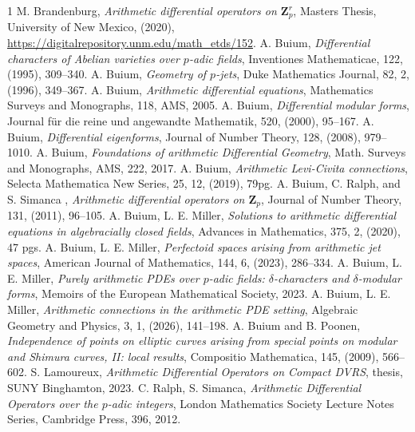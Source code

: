 \documentclass[10pt]{amsart}
\theoremstyle{Theorem}
\theoremstyle{definition}
\newcommand{\ZZ}{\mathbf Z}
\begin{document}
\begin{thebibliography}{1}
 M. Brandenburg, {\em Arithmetic differential operators on $\ZZ_p^r$}, Masters Thesis, University of New Mexico, (2020), \url{https://digitalrepository.unm.edu/math_etds/152}. 
 A. Buium, {\em Differential characters of Abelian varieties over $p$-adic fields}, Inventiones Mathematicae, 122, (1995), 309--340. 
 A. Buium, {\em Geometry of $p$-jets}, Duke Mathematics Journal, 82, 2, (1996), 349--367. A. Buium, {\em Arithmetic differential equations}, Mathematics Surveys and Monographs, 118, AMS, 2005.
 A. Buium, {\em Differential modular forms}, Journal f\"ur die reine und angewandte Mathematik, 520, (2000), 95--167.
 A. Buium, {\it Differential eigenforms}, Journal of Number Theory, 128, (2008), 979--1010.
 A. Buium, {\em Foundations of arithmetic Differential Geometry}, Math. Surveys and Monographs, AMS, 222, 2017.
 A. Buium, {\em Arithmetic Levi-Civita connections}, Selecta Mathematica New Series, 25, 12, (2019), 79pg.
 A. Buium, C. Ralph, and S. Simanca , {\em Arithmetic differential operators on $\ZZ_p$}, Journal of Number Theory, 131, (2011), 96--105.
 A. Buium, L. E. Miller, {\em Solutions to arithmetic differential equations in algebracially closed fields}, Advances in Mathematics, 375, 2, (2020), 47 pgs.
 A. Buium, L. E. Miller, {\em Perfectoid spaces arising from arithmetic jet spaces}, American Journal of Mathematics, 144, 6, (2023), 286--334.
 A. Buium, L. E. Miller, {\em Purely arithmetic PDEs over $p$-adic fields: $\delta$-characters and $\delta$-modular forms}, Memoirs of the European Mathematical Society, 2023.
 A. Buium, L. E. Miller, {\em Arithmetic connections in the arithmetic PDE setting}, Algebraic Geometry and Physics, 3, 1, (2026), 141--198. 
 A. Buium and B. Poonen, {\em Independence of points on elliptic curves arising from special points on modular and Shimura curves, II: local results}, Compositio Mathematica, 145, (2009), 566--602.
 S. Lamoureux, {\em Arithmetic Differential Operators on Compact DVRS}, thesis, SUNY Binghamton, 2023. 
 C. Ralph, S. Simanca, {\em Arithmetic Differential Operators over the $p$-adic integers}, London Mathematics Society Lecture Notes Series, Cambridge Press, 396, 2012. 
\end{thebibliography}
\end{document}
